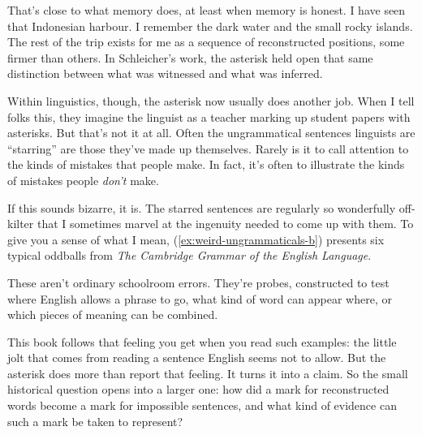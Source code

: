 That's close to what memory does, at least when memory is honest. I
have seen that Indonesian harbour. I remember the dark water and the
small rocky islands. The rest of the trip exists for me as a sequence of
reconstructed positions, some firmer than others. In Schleicher's work,
the asterisk held open that same distinction between what was witnessed
and what was inferred.

Within linguistics, though, the asterisk now usually does another job.
When I tell folks this, they imagine the linguist as a teacher marking
up student papers with asterisks. But that's not it at all. Often the
ungrammatical sentences linguists are \enquote{starring} are those
they've made up themselves. Rarely is it to call attention to the kinds
of mistakes that people make. In fact, it's often to illustrate the kinds
of mistakes people \emph{don't} make.

If this sounds bizarre, it is. The starred sentences are regularly so
wonderfully off-kilter that I sometimes marvel at the ingenuity needed
to come up with them. To give you a sense of what I mean,
(\ref{ex:weird-ungrammaticals-b}) presents six typical oddballs from
\textit{The Cambridge Grammar of the English Language}.

\ea \label{ex:weird-ungrammaticals-b}
    \z
\z

These aren't ordinary schoolroom errors. They're probes, constructed to
test where English allows a phrase to go, what kind of word can appear
where, or which pieces of meaning can be combined.

This book follows that feeling you get when you read such examples: the
little jolt that comes from reading a sentence English seems not to
allow. But the asterisk does more than report that feeling. It turns it
into a claim. So the small historical question opens into a larger one:
how did a mark for reconstructed words become a mark for impossible
sentences, and what kind of evidence can such a mark be taken to
represent?

